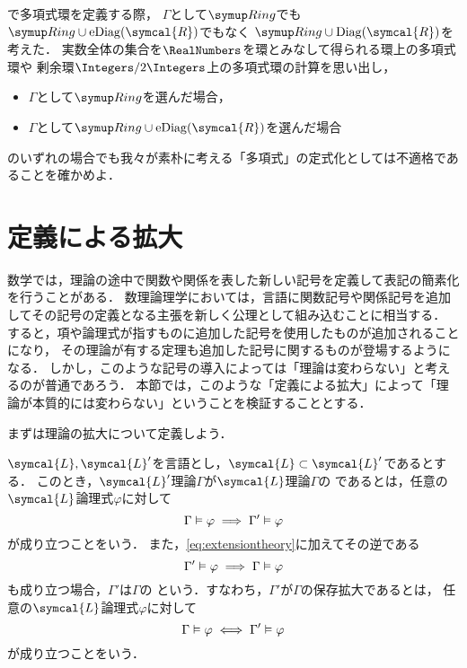 \begin{Que} \label{Que:polynomialringherbrandmodel}
	で多項式環を定義する際，
	\(\Gamma\)として\(\Ring\)でも\(\Ring \cup \apply{\eDiag}{\symcal{R}}\)でもなく
	\(\Ring \cup \apply{\Diag}{\symcal{R}}\)を考えた．
	実数全体の集合を\(\RealNumbers\)を環とみなして得られる環上の多項式環や
	剰余環\(\Integers/2\Integers\)上の多項式環の計算を思い出し，
	\begin{itemize}
		\item \(\Gamma\)として\(\Ring\)を選んだ場合，
		\item \(\Gamma\)として\(\Ring \cup \apply{\eDiag}{\symcal{R}}\)を選んだ場合
	\end{itemize}
	のいずれの場合でも我々が素朴に考える「多項式」の定式化としては不適格であることを確かめよ．
\end{Que}


\section{定義による拡大} \label{sec:extensionbydefinition}

数学では，理論の途中で関数や関係を表した新しい記号を定義して表記の簡素化を行うことがある．
数理論理学においては，言語に関数記号や関係記号を追加してその記号の定義となる主張を新しく公理として組み込むことに相当する．
すると，項や論理式が指すものに追加した記号を使用したものが追加されることになり，
その理論が有する定理も追加した記号に関するものが登場するようになる．
しかし，このような記号の導入によっては「理論は変わらない」と考えるのが普通であろう．
本節では，このような「定義による拡大」によって「理論が本質的には変わらない」ということを検証することとする．

まずは理論の拡大について定義しよう．

\begin{Def} \label{Def:extensiontheory}
	\(\symcal{L}, \symcal{L}'\)を言語とし，\(\symcal{L} \subset \symcal{L}'\)であるとする．
	このとき，\(\symcal{L}'\)理論\(\Gamma\)が\(\symcal{L}\)理論\(\Gamma\)の%
	であるとは，任意の\(\symcal{L}\)論理式\(\varphi\)に対して
	\begin{equation}
		\Gamma \vDash \varphi \implies \Gamma' \vDash \varphi
		\label{eq:extensiontheory}
	\end{equation}
	が成り立つことをいう．
	また，\cref{eq:extensiontheory}に加えてその逆である
	\begin{equation}
		\Gamma' \vDash \varphi \implies \Gamma \vDash \varphi
		\label{eq:conservationextensiontheoryoneside}
	\end{equation}
	も成り立つ場合，\(\Gamma'\)は\(\Gamma\)の%
	という．すなわち，\(\Gamma'\)が\(\Gamma\)の保存拡大であるとは，
	任意の\(\symcal{L}\)論理式\(\varphi\)に対して
	\begin{equation}
		\Gamma \vDash \varphi \iff \Gamma' \vDash \varphi
		\label{eq:conservationextensiontheory}
	\end{equation}
	が成り立つことをいう．
\end{Def}

